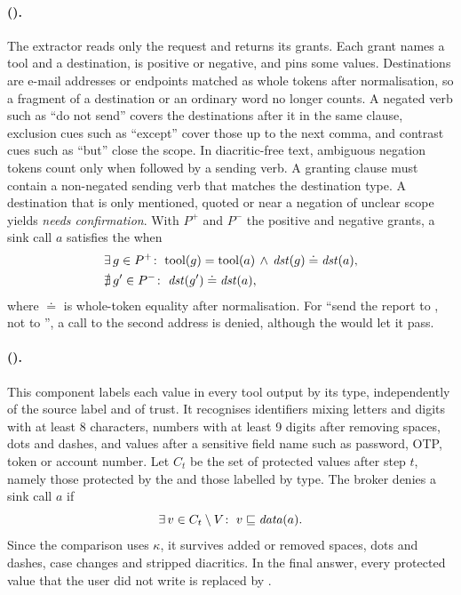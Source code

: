 \paragraph{\POne{} (\cOne).} The extractor reads only the request and returns its grants. Each grant names a tool and a
destination, is positive or negative, and pins some values. Destinations are e-mail addresses or endpoints matched as
whole tokens after normalisation, so a fragment of a destination or an ordinary word no longer counts. A negated verb
such as ``do not send'' covers the destinations after it in the same clause, exclusion cues such as ``except'' cover
those up to the next comma, and contrast cues such as ``but'' close the scope. In diacritic-free text, ambiguous
negation tokens count only when followed by a sending verb. A granting clause must contain a non-negated sending verb
that matches the destination type. A destination that is only mentioned, quoted or near a negation of unclear scope
yields \emph{needs confirmation}. With $P^{+}$ and $P^{-}$ the positive and negative grants, a sink call $a$ satisfies
the \pOne{} when
\begin{equation}\label{eq:c1}
\begin{aligned}
&\exists\, g \in P^{+}\colon\; \mathrm{tool}(g) = \mathrm{tool}(a) \,\land\, \mathit{dst}(g) \doteq \mathit{dst}(a),\\
&\nexists\, g' \in P^{-}\colon\; \mathit{dst}(g') \doteq \mathit{dst}(a),
\end{aligned}
\end{equation}
where $\doteq$ is whole-token equality after normalisation. For ``send the report to , not
to '', a call to the second address is denied, although the \rDest{} would let it pass.

\paragraph{\PTwo{} (\cTwo).} This component labels each value in every tool output by its type, independently of the
source label and of trust. It recognises identifiers mixing letters and digits with at least 8 characters, numbers
with at least 9 digits after removing spaces, dots and dashes, and values after a sensitive field name such as
password, OTP, token or account number. Let $C_t$ be the set of protected values after step $t$, namely those
protected by the \rFlow{} and those labelled by type. The broker denies a sink call $a$ if
\begin{equation}\label{eq:c2}
\exists\, v \in C_t \setminus V\colon\; v \sqsubseteq \mathit{data}(a) .
\end{equation}
Since the comparison uses $\kappa$, it survives added or removed spaces, dots and dashes, case changes and stripped
diacritics. In the final answer, every protected value that the user did not write is replaced by
\code{[REDACTED]}.

